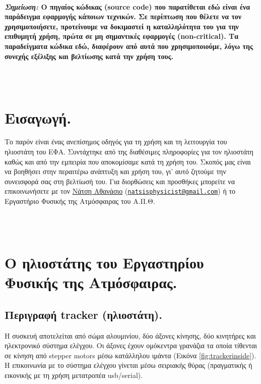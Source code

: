 \documentclass[
  a4paper,
  twoside,
  titlepage,
  11pt]{article}
\numberwithin{equation}{section}
\numberwithin{figure}{section}
\numberwithin{table}{section}
\begin{document}
~
\vfill
~

\textbf{\emph{Σημείωση:} Ο πηγαίος κώδικας (source code) που παρατίθεται εδώ είναι ένα
παράδειγμα εφαρμογής κάποιων τεχνικών. Σε περίπτωση που θέλετε να τον
χρησιμοποιήσετε, προτείνουμε να δοκιμαστεί η καταλληλότητα του για την επιθυμητή
χρήση, πρώτα σε μη σημαντικές εφαρμογές (non-critical). Τα παραδείγματα κώδικα εδώ,
διαφέρουν από αυτά που χρησιμοποιούμε, λόγω της συνεχής εξέλιξης και βελτίωσης κατά
την χρήση τους.}

\newpage

~\\
\vfill
~\\

\hypertarget{intro}{%
\section*{Εισαγωγή.}\label{intro}}

Το παρόν είναι ένας ανεπίσημος οδηγός για τη χρήση και τη λειτουργία του ηλιοστάτη του ΕΦΑ. Συντάχτηκε από της διαθέσιμες πληροφορίες για τον ηλιοστάτη καθώς και από την εμπειρία που αποκομίσαμε κατά τη χρήση του. Σκοπός μας είναι να βοηθήσει στην περαιτέρω ανάπτυξη και χρήση του, γι' αυτό ζητούμε την συνεισφορά σας στη βελτίωσή του. Για διορθώσεις και προσθήκες μπορείτε να επικοινωνήσετε με τον \href{mailto:natsisphysicist@gmail.com}{Νάτση Αθανάσιο} (\href{mailto:natsisphysicist@gmail.com}{\nolinkurl{natsisphysicist@gmail.com}}) ή το Εργαστήριο Φυσικής της Ατμόσφαιρας του Α.Π.Θ.

~\\
\vfill
~\\

\newpage

\hypertarget{tracker}{%
\section{Ο ηλιοστάτης του Εργαστηρίου Φυσικής της Ατμόσφαιρας.}\label{tracker}}

\hypertarget{trackerdescription}{%
\subsection{Περιγραφή tracker (ηλιοστάτη).}\label{trackerdescription}}

Η συσκευή αποτελείται από σώμα αλουμινίου, δύο άξονες κίνησης, δύο κινητήρες και
ηλεκτρονικό σύστημα ελέγχου. Οι άξονες έχουν ομόκεντρα γρανάζια τα οποία τίθενται σε
κίνηση από stepper motors μέσω κατάλληλου ιμάντα (Εικόνα \ref{fig:trackerinside}).
Η επικοινωνία με το σύστημα ελέγχου γίνεται μέσω σειριακής θύρας (πραγματικής ή
εικονικής με τη χρήση μετατροπέα usb/serial).
\end{document}

